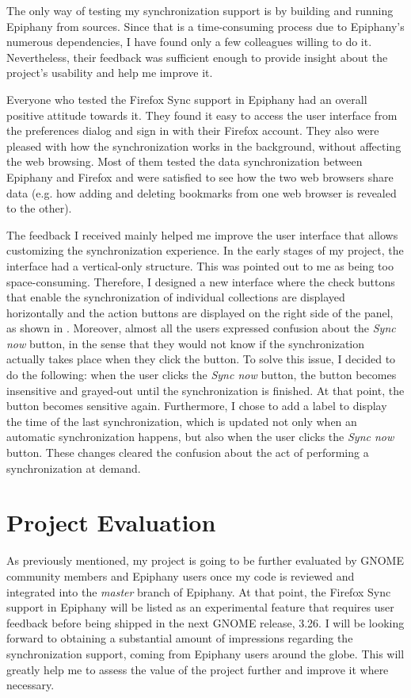 The only way of testing my synchronization support is by building and running Epiphany from sources. Since that is a time-consuming process due to Epiphany's numerous dependencies, I have found only a few colleagues willing to do it. Nevertheless, their feedback was sufficient enough to provide insight about the project's usability and help me improve it.

Everyone who tested the Firefox Sync support in Epiphany had an overall positive attitude towards it. They found it easy to access the user interface from the preferences dialog and sign in with their Firefox account. They also were pleased with how the synchronization works in the background, without affecting the web browsing. Most of them tested the data synchronization between Epiphany and Firefox and were satisfied to see how the two web browsers share data (e.g. how adding and deleting bookmarks from one web browser is revealed to the other).

The feedback I received mainly helped me improve the user interface that allows customizing the synchronization experience. In the early stages of my project, the interface had a vertical-only structure. This was pointed out to me as being too space-consuming. Therefore, I designed a new interface where the check buttons that enable the synchronization of individual collections are displayed horizontally and the action buttons are displayed on the right side of the panel, as shown in . Moreover, almost all the users expressed confusion about the \textit{Sync now} button, in the sense that they would not know if the synchronization actually takes place when they click the button. To solve this issue, I decided to do the following: when the user clicks the \textit{Sync now} button, the button becomes insensitive and grayed-out until the synchronization is finished. At that point, the button becomes sensitive again. Furthermore, I chose to add a label to display the time of the last synchronization, which is updated not only when an automatic synchronization happens, but also when the user clicks the \textit{Sync now} button. These changes cleared the confusion about the act of performing a synchronization at demand.

\section{Project Evaluation}
\label{sec:project-evaluation}

As previously mentioned, my project is going to be further evaluated by GNOME community members and Epiphany users once my code is reviewed and integrated into the \textit{master} branch of Epiphany. At that point, the Firefox Sync support in Epiphany will be listed as an experimental feature that requires user feedback before being shipped in the next GNOME release, 3.26. I will be looking forward to obtaining a substantial amount of impressions regarding the synchronization support, coming from Epiphany users around the globe. This will greatly help me to assess the value of the project further and improve it where necessary.
